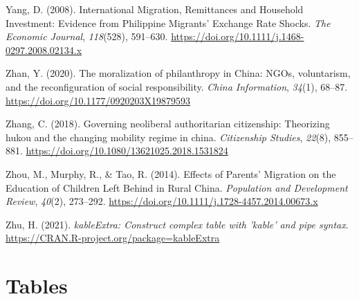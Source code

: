 \documentclass[
  man,floatsintext]{apa7}
\newlength{\cslhangindent}
\newlength{\cslentryspacingunit} %
\newenvironment{CSLReferences}[2] %
 {%
  \setlength{\parindent}{0pt}
  \ifodd #1
  \let\oldpar\par
  \def\par{\hangindent=\cslhangindent\oldpar}
  \fi
  \setlength{\parskip}{#2\cslentryspacingunit}
 }%
 {}
\begin{document}
\begin{CSLReferences}{1}{0}
\leavevmode{}%
Yang, D. (2008). International Migration, Remittances and Household Investment: Evidence from Philippine Migrants{'} Exchange Rate Shocks. \emph{The Economic Journal}, \emph{118}(528), 591--630. \url{https://doi.org/10.1111/j.1468-0297.2008.02134.x}

\leavevmode{}%
Zhan, Y. (2020). The moralization of philanthropy in China: NGOs, voluntarism, and the reconfiguration of social responsibility. \emph{China Information}, \emph{34}(1), 68--87. \url{https://doi.org/10.1177/0920203X19879593}

\leavevmode{}%
Zhang, C. (2018). Governing neoliberal authoritarian citizenship: Theorizing hukou and the changing mobility regime in china. \emph{Citizenship Studies}, \emph{22}(8), 855--881. \url{https://doi.org/10.1080/13621025.2018.1531824}

\leavevmode{}%
Zhou, M., Murphy, R., \& Tao, R. (2014). Effects of Parents' Migration on the Education of Children Left Behind in Rural China. \emph{Population and Development Review}, \emph{40}(2), 273--292. \url{https://doi.org/10.1111/j.1728-4457.2014.00673.x}

\leavevmode{}%
Zhu, H. (2021). \emph{kableExtra: Construct complex table with 'kable' and pipe syntax}. \url{https://CRAN.R-project.org/package=kableExtra}

\end{CSLReferences}

\newpage

\hypertarget{appendix-the-appendix}{%
\appendix}


\hypertarget{tables}{%
\section{Tables}\label{tables}}
\end{document}
